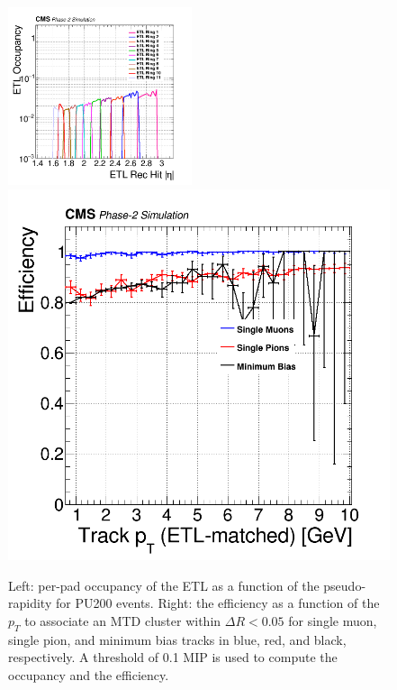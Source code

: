 \begin{figure}[hbtp]
\centering
\includegraphics[width=0.48\textwidth]{fig/performance/occupancy_recHit_eta_allHitsRings1to11_200PU_ETL_plusSide.png}
\includegraphics[width=0.48\linewidth]{fig/performance/h_3_track_pt_atETL_energyThresholdEff.png}
\caption{Left: per-pad occupancy of the ETL as a function of the pseudo-rapidity for PU200 events. Right: the efficiency as a function of the $p_{T}$ to associate an MTD cluster within $\Delta R<0.05$ for single muon, single pion, and minimum bias tracks in blue, red, and black, respectively. A threshold of 0.1 MIP is used to compute the occupancy and the efficiency.}
\label{fig:ETL_sim}
\end{figure}



